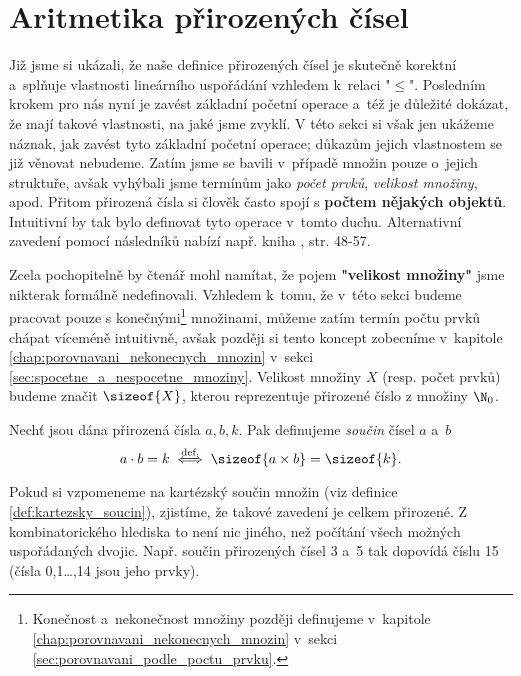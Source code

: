 \section{Aritmetika přirozených čísel}\label{sec:aritmetika_prirozenych_cisel}
Již jsme si ukázali, že naše definice přirozených čísel je skutečně korektní a~splňuje vlastnosti lineárního uspořádání vzhledem k~relaci "$\leq$". Posledním krokem pro nás nyní je zavést základní početní operace a~též je důležité dokázat, že mají takové vlastnosti, na jaké jsme zvyklí. V této sekci si však jen ukážeme náznak, jak zavést tyto základní početní operace; důkazům jejich vlastnostem se již věnovat nebudeme. Zatím jsme se bavili v~případě množin pouze o~jejich struktuře, avšak vyhýbali jsme termínům jako \emph{počet prvků}, \emph{velikost množiny}, apod. Přitom přirozená čísla si člověk často spojí s \textbf{počtem nějakých objektů}. Intuitivní by tak bylo definovat tyto operace v~tomto duchu. Alternativní zavedení pomocí následníků nabízí např. kniha \cite{Goldrei2017}, str. 48-57.\par
Zcela pochopitelně by čtenář mohl namítat, že pojem \textbf{"velikost množiny"} jsme nikterak formálně nedefinovali. Vzhledem k~tomu, že v~této sekci budeme pracovat pouze s konečnými\footnote{Konečnost a~nekonečnost množiny později definujeme v~kapitole \ref{chap:porovnavani_nekonecnych_mnozin} v~sekci \ref{sec:porovnavani_podle_poctu_prvku}.} množinami, můžeme zatím termín počtu prvků chápat víceméně intuitivně, avšak později si tento koncept zobecníme v~kapitole \ref{chap:porovnavani_nekonecnych_mnozin} v~sekci \ref{sec:spocetne_a_nespocetne_mnoziny}. Velikost množiny $X$ (resp. počet prvků) budeme značit $\sizeof{X}$, kterou reprezentuje přirozené číslo z množiny $\N_0$.\par
\begin{definition}\label{def:soucin_pritozenych_cisel}
    Nechť jsou dána přirozená čísla $a,b,k$. Pak definujeme \emph{součin} čísel $a$ a~$b$
    \begin{equation*}
        a\cdot b=k\stackrel{\text{def.}}{\iff} \sizeof{a\times b}=\sizeof{k}.
    \end{equation*}
\end{definition}
Pokud si vzpomeneme na kartézský součin množin (viz definice \ref{def:kartezsky_soucin}), zjistíme, že takové zavedení je celkem přirozené. Z kombinatorického hlediska to není nic jiného, než počítání všech možných uspořádaných dvojic. Např. součin přirozených čísel 3 a~5 tak dopovídá číslu 15 (čísla 0,1\dots,14 jsou jeho prvky).\par
